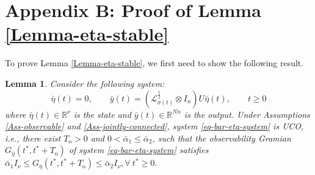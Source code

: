\documentclass[twocolumn]{autart}
\newcommand{\RR}{\mathbb{R}}
\newtheorem{Lemma}{Lemma}
\begin{document}
\section*{Appendix B: Proof of Lemma \ref{Lemma-eta-stable}}
To prove Lemma \ref{Lemma-eta-stable}, we first need to show the following result.


\begin{Lemma}\label{Lemma-UCO}
Consider the following system:
\begin{equation}\label{eq-bar-eta-system}
    \dot{\bar{\eta}}(t)=0, \qquad \bar{y}(t)=\left(\mathcal{L}_{\sigma(t)}^{\frac{1}{2}} \otimes I_{n}\right)U \bar{\eta}(t), \qquad t\ge 0
\end{equation}
where $\bar{\eta}(t)\in \RR^{\nu}$ is the state and $\bar{y}(t) \in \RR^{Nn}$ is the output.
Under Assumptions \ref{Ass-observable} and \ref{Ass-jointly-connected},
  system \eqref{eq-bar-eta-system} is UCO, i.e.,
  there exist $T_{\text{o}}>0$ and $0<\bar{\alpha}_{1}\le \bar{\alpha}_{2}$,
  such that the observability Gramian
  $G_{\bar{\eta}}(t^{*},t^{*}+T_{\text{o}})$ of system \eqref{eq-bar-eta-system} satisfies
$
    \bar{\alpha}_{1}I_{\nu} \le G_{\bar{\eta}}(t^{*},t^{*}+T_{\text{o}}) \le \bar{\alpha}_{2}I_{\nu}, \forall\ t^{*}\ge 0.
$
\end{Lemma}
\end{document}
